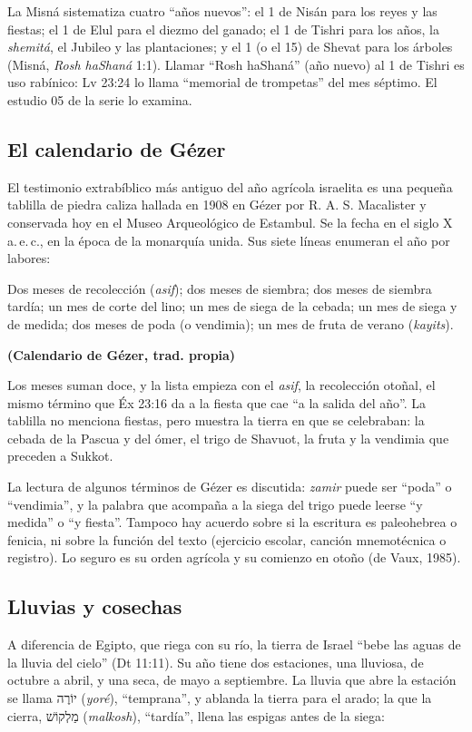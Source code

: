 \documentclass[11pt,letterpaper]{article}
\newcommand{\heb}[1]{\mbox{\foreignlanguage{hebrew}{#1}}}
\newcommand{\fuente}[1]{\par\hfill{\upshape\bfseries\small\textcolor{tierraroja}{#1}}}
\begin{document}
\begin{nota}[Precisión]
La Misná sistematiza cuatro ``años nuevos'': el 1 de Nisán para los reyes y las fiestas; el 1 de Elul para el diezmo del ganado; el 1 de Tishri para los años, la \emph{shemitá}, el Jubileo y las plantaciones; y el 1 (o el 15) de Shevat para los árboles (Misná, \emph{Rosh haShaná} 1:1). Llamar ``Rosh haShaná'' (año nuevo) al 1 de Tishri es uso rabínico: Lv 23:24 lo llama ``memorial de trompetas'' del mes séptimo. El estudio 05 de la serie lo examina.
\end{nota}

\subsection{El calendario de Gézer}
El testimonio extrabíblico más antiguo del año agrícola israelita es una pequeña tablilla de piedra caliza hallada en 1908 en Gézer por R. A. S. Macalister y conservada hoy en el Museo Arqueológico de Estambul. Se la fecha en el siglo X a.\,e.\,c., en la época de la monarquía unida. Sus siete líneas enumeran el año por labores:

\begin{cita}Dos meses de recolección (\emph{asif}); dos meses de siembra; dos meses de siembra tardía; un mes de corte del lino; un mes de siega de la cebada; un mes de siega y de medida; dos meses de poda (o vendimia); un mes de fruta de verano (\emph{kayits}).\fuente{(Calendario de Gézer, trad. propia)}\end{cita}

Los meses suman doce, y la lista empieza con el \emph{asif}, la recolección otoñal, el mismo término que Éx 23:16 da a la fiesta que cae ``a la salida del año''. La tablilla no menciona fiestas, pero muestra la tierra en que se celebraban: la cebada de la Pascua y del ómer, el trigo de Shavuot, la fruta y la vendimia que preceden a Sukkot.

\begin{nota}[Precisión]
La lectura de algunos términos de Gézer es discutida: \emph{zamir} puede ser ``poda'' o ``vendimia'', y la palabra que acompaña a la siega del trigo puede leerse ``y medida'' o ``y fiesta''. Tampoco hay acuerdo sobre si la escritura es paleohebrea o fenicia, ni sobre la función del texto (ejercicio escolar, canción mnemotécnica o registro). Lo seguro es su orden agrícola y su comienzo en otoño (de Vaux, 1985).
\end{nota}

\subsection{Lluvias y cosechas}
A diferencia de Egipto, que riega con su río, la tierra de Israel ``bebe las aguas de la lluvia del cielo'' (Dt 11:11). Su año tiene dos estaciones, una lluviosa, de octubre a abril, y una seca, de mayo a septiembre. La lluvia que abre la estación se llama \heb{יוֹרֶה} (\emph{yoré}), ``temprana'', y ablanda la tierra para el arado; la que la cierra, \heb{מַלְקוֹשׁ} (\emph{malkosh}), ``tardía'', llena las espigas antes de la siega:
\end{document}
